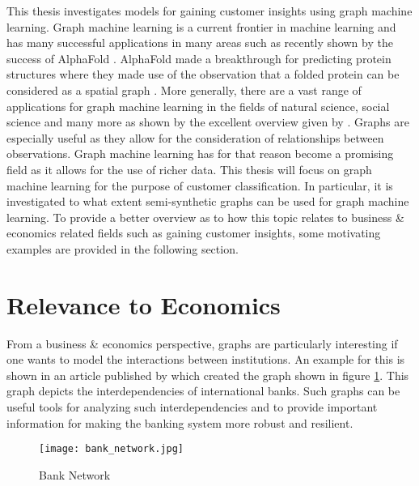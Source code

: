 	
	This thesis investigates models for gaining customer insights using graph
	machine learning. Graph machine learning is a current frontier in machine 
	learning and has many successful applications in many areas such as recently 
	shown by the success of AlphaFold \citep{senior2020improved}. AlphaFold made 
	a breakthrough for predicting protein structures where they made use of the 
	observation that a folded protein can be considered as a spatial graph 
	\citep{AlphaFoldTeam2020}. More generally, there are a vast range of 
	applications for graph machine learning in the fields of natural science, 
	social science and many more as shown by the excellent overview given by 
	\cite{zhou2020graph}. Graphs are especially useful as they allow for the 
	consideration of relationships between observations. Graph machine learning 
	has for that reason become a promising field as it allows for the use of
	richer data. This thesis will focus on graph machine learning for the
	purpose of customer classification. In particular, it is investigated to
	what extent semi-synthetic graphs can be used for graph machine learning.
	To provide a better overview as to how this topic relates to business \& 
	economics related fields such as gaining customer insights, some motivating
	examples are provided in the following section. 
	
	\section{Relevance to Economics}

	\noindent From a business \& economics perspective, graphs are particularly
	interesting if one wants to model the interactions between institutions. An 
	example for this is shown in an article published by 
	\cite{schweitzer2009economic} which created the graph shown in figure
	\ref{fig:bank_network}. This graph depicts the interdependencies of 
	international banks. Such graphs can be useful tools for analyzing such 
	interdependencies and to provide important information for making the banking 
	system more robust and resilient. 

	\begin{figure}[h]
		\centering
		\texttt{[image: bank\_network.jpg]}
		\caption{Bank Network}
		\cite[p. 424]{schweitzer2009economic}
		\label{fig:bank_network}
	\end{figure} 


